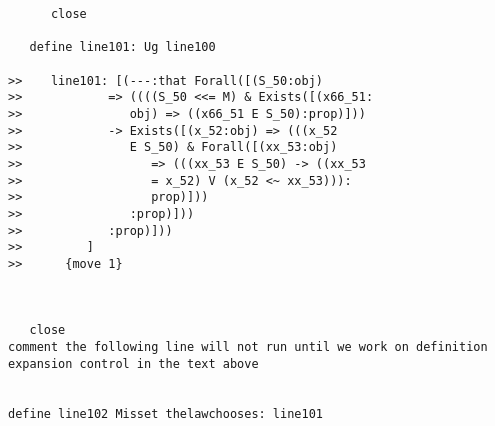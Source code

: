 \documentclass[12pt]{article}
\begin{document}
\begin{verbatim}
      close

   define line101: Ug line100

>>    line101: [(---:that Forall([(S_50:obj)
>>            => ((((S_50 <<= M) & Exists([(x66_51:
>>               obj) => ((x66_51 E S_50):prop)]))
>>            -> Exists([(x_52:obj) => (((x_52
>>               E S_50) & Forall([(xx_53:obj)
>>                  => (((xx_53 E S_50) -> ((xx_53
>>                  = x_52) V (x_52 <~ xx_53))):
>>                  prop)]))
>>               :prop)]))
>>            :prop)]))
>>         ]
>>      {move 1}



   close
comment the following line will not run until we work on definition expansion control in the text above


define line102 Misset thelawchooses: line101



\end{verbatim}
\end{document}
